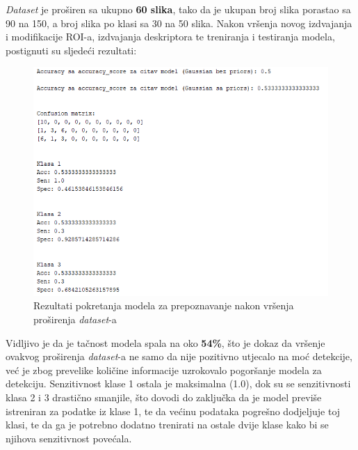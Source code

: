 \documentclass[12pt,a4paper]{article}
\begin{document}
\textit{Dataset} je proširen sa ukupno \textbf{60 slika}, tako da je ukupan broj slika porastao sa 90 na 150, a broj slika po klasi sa 30 na 50 slika. Nakon vršenja novog izdvajanja i modifikacije ROI-a, izdvajanja deskriptora te treniranja i testiranja modela, postignuti su sljedeći rezultati:

\begin{figure}[H]

\center
\includegraphics[scale=0.9]{slikaExtended.png}
\caption{Rezultati pokretanja modela za prepoznavanje nakon vršenja proširenja \textit{dataset}-a}
	
\end{figure}

Vidljivo je da je tačnost modela spala na oko \textbf{54\%}, što je dokaz da vršenje ovakvog proširenja \textit{dataset}-a ne samo da nije pozitivno utjecalo na moć detekcije, već je zbog prevelike količine informacije uzrokovalo pogoršanje modela za detekciju. Senzitivnost klase 1 ostala je maksimalna (1.0), dok su se senzitivnosti klasa 2 i 3 drastično smanjile, što dovodi do zaključka da je model previše istreniran za podatke iz klase 1, te da većinu podataka pogrešno dodjeljuje toj klasi, te da ga je potrebno dodatno trenirati na ostale dvije klase kako bi se njihova senzitivnost povećala.
\end{document}
